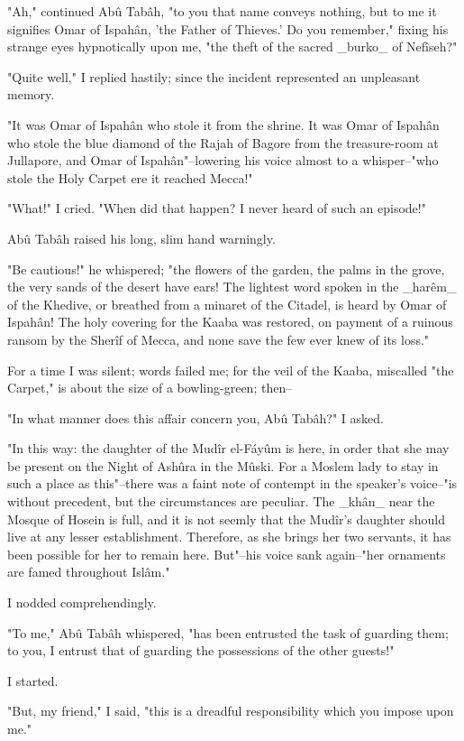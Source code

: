 "Ah," continued Abû Tabâh, "to you that name conveys nothing, but to
me it signifies Omar of Ispahân, 'the Father of Thieves.' Do you
remember," fixing his strange eyes hypnotically upon me, "the theft
of the sacred _burko_ of Nefîseh?"

"Quite well," I replied hastily; since the incident represented an
unpleasant memory.

"It was Omar of Ispahân who stole it from the shrine. It was Omar of
Ispahân who stole the blue diamond of the Rajah of Bagore from the
treasure-room at Jullapore, and Omar of Ispahân"--lowering his voice
almost to a whisper--"who stole the Holy Carpet ere it reached Mecca!"

"What!" I cried. "When did that happen? I never heard of such an
episode!"

Abû Tabâh raised his long, slim hand warningly.

"Be cautious!" he whispered; "the flowers of the garden, the palms in
the grove, the very sands of the desert have ears! The lightest word
spoken in the _harêm_ of the Khedive, or breathed from a minaret of
the Citadel, is heard by Omar of Ispahân! The holy covering for the
Kaaba was restored, on payment of a ruinous ransom by the Sherîf of
Mecca, and none save the few ever knew of its loss."

For a time I was silent; words failed me; for the veil of the Kaaba,
miscalled "the Carpet," is about the size of a bowling-green; then--

"In what manner does this affair concern you, Abû Tabâh?" I asked.

"In this way: the daughter of the Mudîr el-Fáyûm is here, in order
that she may be present on the Night of Ashûra in the Mûski. For a
Moslem lady to stay in such a place as this"--there was a faint note
of contempt in the speaker's voice--"is without precedent, but the
circumstances are peculiar. The _khân_ near the Mosque of Hosein is
full, and it is not seemly that the Mudîr's daughter should live at
any lesser establishment. Therefore, as she brings her two servants,
it has been possible for her to remain here. But"--his voice sank
again--"her ornaments are famed throughout Islâm."

I nodded comprehendingly.

"To me," Abû Tabâh whispered, "has been entrusted the task of guarding
them; to you, I entrust that of guarding the possessions of the other
guests!"

I started.

"But, my friend," I said, "this is a dreadful responsibility which you
impose upon me."

